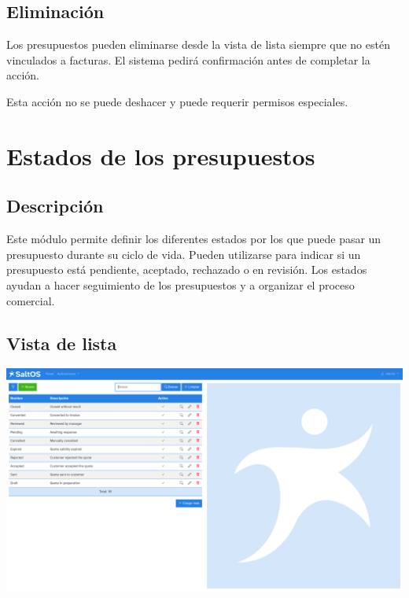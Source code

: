 \documentclass[a4paper]{article}
\begin{document}
\hypertarget{toc75}{}
\subsection{Eliminación}

Los presupuestos pueden eliminarse desde la vista de lista siempre que no estén vinculados a facturas.
El sistema pedirá confirmación antes de completar la acción.

Esta acción no se puede deshacer y puede requerir permisos especiales.


\hypertarget{toc76}{}
\section{Estados de los presupuestos}

\hypertarget{toc77}{}
\subsection{Descripción}

Este módulo permite definir los diferentes estados por los que puede pasar un presupuesto durante su ciclo de vida.
Pueden utilizarse para indicar si un presupuesto está pendiente, aceptado, rechazado o en revisión.
Los estados ayudan a hacer seguimiento de los presupuestos y a organizar el proceso comercial.

\hypertarget{toc78}{}
\subsection{Vista de lista}

\begin{center}\includegraphics[width=1\textwidth]{../ujest/snaps/test-screenshots-js-screenshots-crm-quotes-status-list-es-es-1-snap.png}\end{center}
\end{document}
